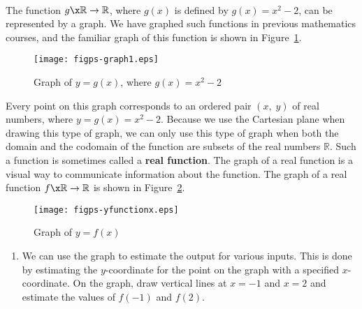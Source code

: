\begin{activity} \label{A:usingagraph} \hfill \\
The function  $g\x \mathbb{R} \to \mathbb{R}$, where  $g( x )$ is defined by  
$g\left( x \right) = x^2  - 2$, can be represented by a graph.  We have graphed such functions in previous mathematics courses, and the familiar graph of this function is shown in Figure~\ref{fig:functiongraph1}.

\begin{figure}[h]
\begin{center}
\texttt{[image: figps-graph1.eps]} 
\caption{Graph of $y = g( x )$, where  $g( x ) = x^2  - 2$} \label{fig:functiongraph1}
\end{center}
\end{figure}

Every point on this graph corresponds to an ordered pair  $\left( {x,\;y} \right)$ of real numbers, where  $y = g( x ) = x^2  - 2$.  Because we use the Cartesian plane when drawing this type of graph, we can only use this type of graph when both the domain and the codomain of the function are subsets of the real numbers  $\mathbb{R}$.  Such a function is sometimes called a \textbf{real function}.
%
%
 The graph of a real function is a visual way to communicate information about the function.  
The graph of a real function  \linebreak
$f\x \mathbb{R} \to \mathbb{R}$ is shown in Figure~\ref{fig:functiongraph2}.
\begin{figure}[h]
\begin{center}
\texttt{[image: figps-yfunctionx.eps]}
\caption{Graph of $y = f\left( x \right)$} \label{fig:functiongraph2}
\end{center}
\end{figure}
\begin{enumerate}
\item We can use the graph to estimate the output for various inputs.  This is done by estimating the $y$-coordinate for the point on the graph with a specified $x$-coordinate.  On the graph, draw vertical lines at  $x =  - 1$  and  $x = 2$ and estimate the values of  
$f( { - 1} )$  and  $f( 2 )$.


\end{enumerate}
\end{activity}
